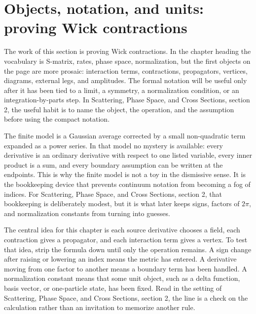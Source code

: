 \section{Objects, notation, and units: proving Wick contractions}













The work of this section is proving Wick contractions.  In the chapter heading the vocabulary is S-matrix, rates, phase space, normalization, but the first objects on the page are more prosaic: interaction terms, contractions, propagators, vertices, diagrams, external legs, and amplitudes.  The formal notation will be useful only after it has been tied to a limit, a symmetry, a normalization condition, or an integration-by-parts step.  In Scattering, Phase Space, and Cross Sections, section 2, the useful habit is to name the object, the operation, and the assumption before using the compact notation.

The finite model is a Gaussian average corrected by a small non-quadratic term expanded as a power series.  In that model no mystery is available: every derivative is an ordinary derivative with respect to one listed variable, every inner product is a sum, and every boundary assumption can be written at the endpoints.  This is why the finite model is not a toy in the dismissive sense.  It is the bookkeeping device that prevents continuum notation from becoming a fog of indices.  For Scattering, Phase Space, and Cross Sections, section 2, that bookkeeping is deliberately modest, but it is what later keeps signs, factors of \(2\pi\), and normalization constants from turning into guesses.

The central idea for this chapter is each source derivative chooses a field, each contraction gives a propagator, and each interaction term gives a vertex.  To test that idea, strip the formula down until only the operation remains.  A sign change after raising or lowering an index means the metric has entered.  A derivative moving from one factor to another means a boundary term has been handled.  A normalization constant means that some unit object, such as a delta function, basis vector, or one-particle state, has been fixed.  Read in the setting of Scattering, Phase Space, and Cross Sections, section 2, the line is a check on the calculation rather than an invitation to memorize another rule.

